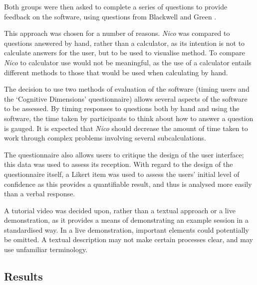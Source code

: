 \documentclass[12pt,twoside,notitlepage,xetex]{report}
\begin{document}
Both groups were then asked to complete a series of questions to provide feedback on the software, using questions from Blackwell and Green \cite{Blackwell2000}.

This approach was chosen for a number of reasons.  \emph{Nico} was compared to questions answered by hand, rather than a calculator, as its intention is not to calculate answers for the user, but to be used to visualise method.  To compare \emph{Nico} to calculator use would not be meaningful, as the use of a calculator entails different methods to those that would be used when calculating by hand.

The decision to use two methods of evaluation of the software (timing users and the `Cognitive Dimensions' questionnaire) allows several aspects of the software to be assessed.  By timing responses to questions both by hand and using the software, the time taken by participants to think about how to answer a question is gauged.  It is expected that \emph{Nico} should decrease the amount of time taken to work through complex problems involving several subcalculations.

The questionnaire also allows users to critique the design of the user interface; this data was used to assess its reception.  With regard to the design of the questionnaire itself, a Likert item was used to assess the users' initial level of confidence as this provides a quantifiable result, and thus is analysed more easily than a verbal response.

A tutorial video was decided upon, rather than a textual approach or a live demonstration, as it provides a means of demonstrating an example session in a standardised way.  In a live demonstration, important elements could potentially be omitted.  A textual description may not make certain processes clear, and may use unfamiliar terminology.

\subsection{Results}
\end{document}
